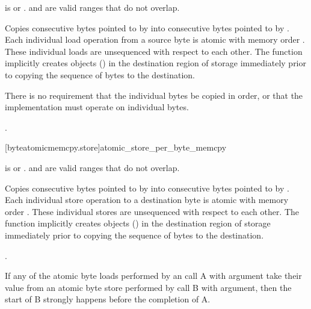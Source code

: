 \begin{itemdescr}
\pnum
\expects

 is  or
. \tcode{(char*)dest + [0, count)}
and \tcode{(const char*)source + [0, count)} are valid ranges
that do not overlap.

\pnum
\effects
Copies  consecutive bytes pointed to by
 into consecutive bytes pointed to by . Each
individual load operation from a source byte is atomic with memory order
. These individual loads are unsequenced with respect to
each other. The function implicitly creates objects ()
in the destination region of storage immediately prior to copying the
sequence of bytes to the destination. 
\begin{note} There is no requirement
that the individual bytes be copied in order, or that the implementation
must operate on individual bytes. \end{note}

\pnum
\returns
{}.
\end{itemdescr}

[byteatomicmemcpy.store]{atomic_store_per_byte_memcpy}
\textbf{}

\begin{itemdescr}
\pnum
\expects
{} is  or
. \tcode{(char*)dest + [0, count)}
and \tcode{(const char*)source + [0, count)} are valid ranges
that do not overlap.

\pnum
\effects
Copies  consecutive bytes pointed to by
 into consecutive bytes pointed to by . Each
individual store operation to a destination byte is atomic with memory
order . These individual stores are unsequenced with
respect to each other. The function implicitly creates objects
() in the destination region of storage immediately
prior to copying the sequence of bytes to the destination.

\pnum
\returns

.
\end{itemdescr}

\begin{note} If any of the atomic byte loads performed by an
 call A with
 argument take their value from an atomic
byte store performed by  call
B with  argument, then the start of B
strongly happens before the completion of A. 
\end{note}  
